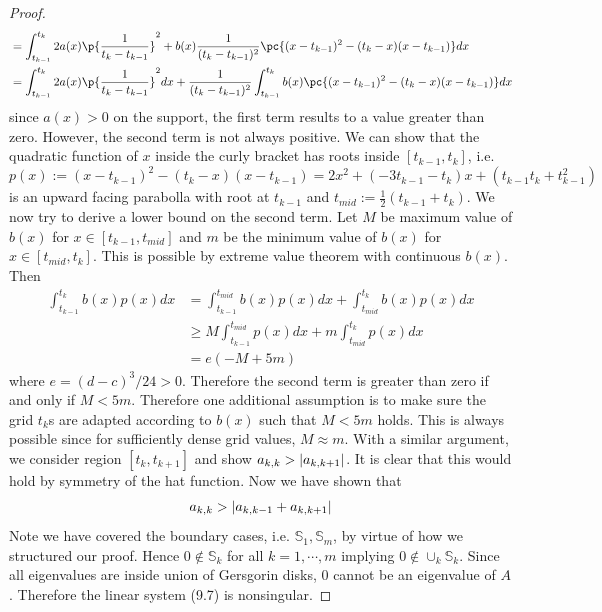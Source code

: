 \documentclass[11pt]{article}
\begin{document}
\begin{proof}
\begin{align*}
        &= \int_{t_{k-1}}^{t_k} 2 a(x) \p{\frac{1}{t_k - t_{k-1}}}^2 + b(x) \frac{1}{(t_k-t_{k-1})^2} \pc{
            (x-t_{k-1})^2 - (t_k-x)(x-t_{k-1})
        } dx  \\
        &= \int_{t_{k-1}}^{t_k} 2 a(x) \p{\frac{1}{t_k - t_{k-1}}}^2 dx + \frac{1}{(t_k-t_{k-1})^2} \int_{t_{k-1}}^{t_k} b(x) \pc{
            (x-t_{k-1})^2 - (t_k-x)(x-t_{k-1})
        } dx 
    \end{align*}
    since $a(x)>0$ on the support, the first term results to a value greater than zero. However, the second term is not always positive. We can show that the quadratic function of $x$ inside the curly bracket has roots inside $[t_{k-1}, t_k]$, i.e. 
    \[
        p(x)
        := (x-t_{k-1})^2 - (t_k-x)(x-t_{k-1}) 
        = 2x^2 + (-3t_{k-1} - t_k) x + (t_{k-1}t_k + t_{k-1}^2)
    \]
    is an upward facing parabolla with root at $t_{k-1}$ and $t_{mid} := \frac{1}{2} (t_{k-1} + t_k)$. We now try to derive a lower bound on the second term. Let $M$ be maximum value of $b(x)$ for $x\in [t_{k-1}, t_{mid}]$ and $m$ be the minimum value of $b(x)$ for $x\in [t_{mid}, t_k]$. This is possible by extreme value theorem with continuous $b(x)$. Then
    \begin{align*}
        \int_{t_{k-1}}^{t_k} b(x) p(x) dx
        &= \int_{t_{k-1}}^{t_{mid}} b(x) p(x) dx + \int_{t_{mid}}^{t_k} b(x) p(x) dx \\
        &\geq M \int_{t_{k-1}}^{t_{mid}} p(x) dx + m \int_{t_{mid}}^{t_k} p(x) dx \\
        &= e ( -M + 5m )
    \end{align*}
    where $e = (d-c)^3/24 > 0$. Therefore the second term is greater than zero if and only if $M < 5m$. Therefore one additional assumption is to make sure the grid $t_k$s are adapted according to $b(x)$ such that $M< 5m$ holds. This is always possible since for sufficiently dense grid values, $M \approx m$. With a similar argument, we consider region $[t_k, t_{k+1}]$ and show $a_{k,k} > \left|a_{k,k+1}\right|$. It is clear that this would hold by symmetry of the hat function. Now we have shown that 
    \[
        a_{k,k} > \left|a_{k,k-1} + a_{k,k+1}\right| 
    \]
    Note we have covered the boundary cases, i.e. $\mathbb{S}_1,\mathbb{S}_m$, by virtue of how we structured our proof. Hence $0\not\in \mathbb{S}_k$ for all $k=1,\cdots, m$ implying $0\not\in \cup_k \mathbb{S}_k$. Since all eigenvalues are inside union of Gersgorin disks, 0 cannot be an eigenvalue of $A$. Therefore the linear system (9.7) is nonsingular.
\end{proof}
\end{document}

